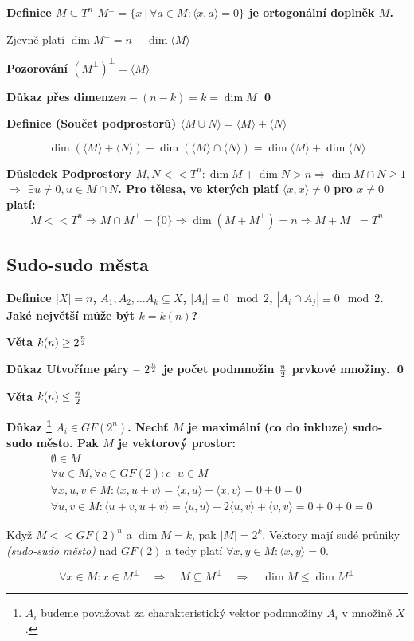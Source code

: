\documentclass[a4paper,12pt,titlepage]{article}
\newcommand{\dk}{\smallskip\noindent\bf Důkaz\rm{} }
\newcommand{\df}{\smallskip\noindent\bf Definice\rm{} }
\newcommand{\vt}{\smallskip\noindent\bf Věta\rm{} }
\newcommand{\poz}{\smallskip\noindent\bf Pozorování\rm{} }
\newcommand{\dsl}{\smallskip\noindent\bf Důsledek\rm{} }
\newcommand{\sk}[1]{\langle #1\rangle}
\begin{document}
\df $M \subseteq T^n$ \quad $M^\bot = \{x\ |\ \forall a\in M: \sk{x,a} = 0\}$ je ortogonální doplněk $M$.

Zjevně platí $\dim M^\bot = n - \dim \sk M$

\poz ${(M^\bot)}^\bot = \sk M$

\dk přes dimenze\quad $n-(n-k) = k = \dim M$ \qed

\df (Součet podprostorů) $\sk{M\cup N} = \sk M + \sk N$

$$\dim\left(\sk M + \sk N\right) + \dim\left(\sk M \cap \sk N\right) = \dim \sk M + \dim \sk N$$

\dsl Podprostory $M,N << T^n: \dim M + \dim N > n \Rightarrow \dim M \cap N \ge 1$ $\Rightarrow$ $\exists u \neq 0, u \in M\cap N$.
Pro tělesa, ve kterých platí $\sk{x,x} \neq 0$ pro $x\neq 0$ platí:
$$M << T^n \Rightarrow M\cap M^\bot = \{0\} \Rightarrow \dim(M+M^\bot) = n \Rightarrow M + M^\bot = T^n$$

\subsection{Sudo-sudo města}

\df $|X| = n$, $A_1, A_2, \dots A_k \subseteq X$, $|A_i| \equiv 0 \mod 2$, $|A_i\cap A_j| \equiv 0 \mod 2$. Jaké největší může být $k = k(n)$?

\vt $k(n) \ge 2^{n\over 2}$

\dk Utvoříme páry -- $2^{n\over 2}$ je počet podmnožin $n\over 2$ prvkové množiny. \qed

\vt $k(n) \le {n\over 2}$

\dk\footnote{$A_i$ budeme považovat za charakteristický vektor podmnožiny $A_i$
v množině $X$.} $A_i \in GF(2^n)$. Nechť $M$ je maximální (co do inkluze)
sudo-sudo město. Pak $M$ je vektorový prostor:
\begin{align}
	&\emptyset \in M \\
	&\forall u \in M, \forall c\in GF(2): c\cdot u \in M \\
	&\forall x,u,v\in M: \sk{x, u+v} = \sk{x,u} + \sk{x,v} = 0 + 0 = 0 \\
	&\forall u,v \in M: \sk{u+v,u+v} = \sk{u,u} + 2\sk{u,v} + \sk{v,v} = 0 + 0 + 0 = 0
\end{align}

Když $M << GF(2)^n$ a $\dim M = k$, pak $|M| = 2^k$. Vektory mají sudé průniky {\it (sudo-sudo město)} nad $GF(2)$ a tedy platí $\forall x,y\in M: \sk{x,y} = 0$.

$$\forall x\in M: x\in M^\bot \quad\Rightarrow\quad M\subseteq M^\bot \quad\Rightarrow\quad \dim M \le \dim M^\bot$$
\end{document}
